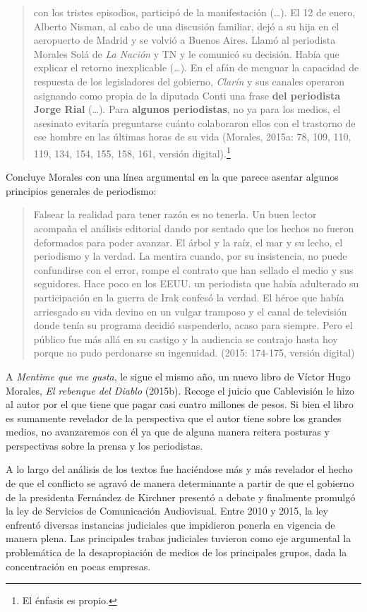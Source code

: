 \begin{quote}
con los tristes episodios, participó de la manifestación (\ldots). El 12 de enero, Alberto Nisman, al cabo de una discusión familiar, dejó a su hija en el aeropuerto de Madrid y se volvió a Buenos Aires. Llamó al periodista Morales Solá de \emph{La Nación} y TN y le comunicó su decisión. Había que explicar el retorno inexplicable (\ldots). En el afán de menguar la capacidad de respuesta de los legisladores del gobierno, \emph{Clarín} y sus canales operaron asignando como propia de la diputada Conti una frase \textbf{del periodista Jorge Rial} (\ldots). Para \textbf{algunos periodistas}, no ya para los medios, el asesinato evitaría preguntarse cuánto colaboraron ellos con el trastorno de ese hombre en las últimas horas de su vida (Morales, 2015a: 78, 109, 110, 119, 134, 154, 155, 158, 161, versión digital).\footnote{El énfasis es propio.}
\end{quote}

Concluye Morales con una línea argumental en la que parece asentar algunos principios generales de periodismo:

\begin{quote}
Falsear la realidad para tener razón es no tenerla. Un buen lector acompaña el análisis editorial dando por sentado que los hechos no fueron deformados para poder avanzar. El árbol y la raíz, el mar y su lecho, el periodismo y la verdad. La mentira cuando, por su insistencia, no puede confundirse con el error, rompe el contrato que han sellado el medio y sus seguidores. Hace poco en los EEUU. un periodista que había adulterado su participación en la guerra de Irak confesó la verdad. El héroe que había arriesgado su vida devino en un vulgar tramposo y el canal de televisión donde tenía su programa decidió suspenderlo, acaso para siempre. Pero el público fue más allá en su castigo y la audiencia se contrajo hasta hoy porque no pudo perdonarse su ingenuidad. (2015: 174-175, versión digital)
\end{quote}

A \emph{Mentime que me gusta}, le sigue el mismo año, un nuevo libro de Víctor Hugo Morales, \emph{El rebenque del Diablo} (2015b). Recoge el juicio que Cablevisión le hizo al autor por el que tiene que pagar casi cuatro millones de pesos. Si bien el libro es sumamente revelador de la perspectiva que el autor tiene sobre los grandes medios, no avanzaremos con él ya que de alguna manera reitera posturas y perspectivas sobre la prensa y los periodistas.

A lo largo del análisis de los textos fue haciéndose más y más revelador el hecho de que el conflicto se agravó de manera determinante a partir de que el gobierno de la presidenta Fernández de Kirchner presentó a debate y finalmente promulgó la ley de Servicios de Comunicación Audiovisual. Entre 2010 y 2015, la ley enfrentó diversas instancias judiciales que impidieron ponerla en vigencia de manera plena. Las principales trabas judiciales tuvieron como eje argumental la problemática de la desapropiación de medios de los principales grupos, dada la concentración en pocas empresas.

